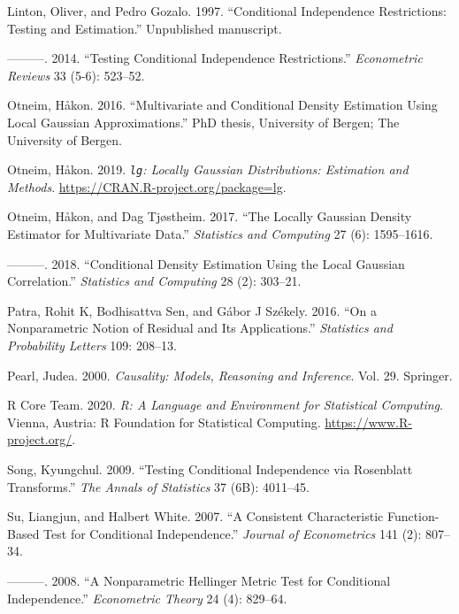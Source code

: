 \documentclass[
  12pt,
  letterpaper]{article}
\theoremstyle{definition}
\theoremstyle{definition}
\theoremstyle{definition}
\theoremstyle{remark}
\begin{document}
\leavevmode\hypertarget{ref-linton1997conditional}{}%
Linton, Oliver, and Pedro Gozalo. 1997. ``Conditional Independence Restrictions: Testing and Estimation.'' Unpublished manuscript.

\leavevmode\hypertarget{ref-linton2014testing}{}%
---------. 2014. ``Testing Conditional Independence Restrictions.'' \emph{Econometric Reviews} 33 (5-6): 523--52.

\leavevmode\hypertarget{ref-otneim2016multivariate}{}%
Otneim, Håkon. 2016. ``Multivariate and Conditional Density Estimation Using Local Gaussian Approximations.'' PhD thesis, University of Bergen; The University of Bergen.

\leavevmode\hypertarget{ref-otneim2019lg}{}%
Otneim, Håkon. 2019. \emph{\texttt{lg}: Locally Gaussian Distributions: Estimation and Methods}. \url{https://CRAN.R-project.org/package=lg}.

\leavevmode\hypertarget{ref-otneim2017locally}{}%
Otneim, Håkon, and Dag Tjøstheim. 2017. ``The Locally Gaussian Density Estimator for Multivariate Data.'' \emph{Statistics and Computing} 27 (6): 1595--1616.

\leavevmode\hypertarget{ref-otneim2017conditional}{}%
---------. 2018. ``Conditional Density Estimation Using the Local Gaussian Correlation.'' \emph{Statistics and Computing} 28 (2): 303--21.

\leavevmode\hypertarget{ref-patra2016on}{}%
Patra, Rohit K, Bodhisattva Sen, and Gábor J Székely. 2016. ``On a Nonparametric Notion of Residual and Its Applications.'' \emph{Statistics and Probability Letters} 109: 208--13.

\leavevmode\hypertarget{ref-pearl2000causality}{}%
Pearl, Judea. 2000. \emph{Causality: Models, Reasoning and Inference}. Vol. 29. Springer.

\leavevmode\hypertarget{ref-r}{}%
R Core Team. 2020. \emph{R: A Language and Environment for Statistical Computing}. Vienna, Austria: R Foundation for Statistical Computing. \url{https://www.R-project.org/}.

\leavevmode\hypertarget{ref-song2009testing}{}%
Song, Kyungchul. 2009. ``Testing Conditional Independence via Rosenblatt Transforms.'' \emph{The Annals of Statistics} 37 (6B): 4011--45.

\leavevmode\hypertarget{ref-su2007consistent}{}%
Su, Liangjun, and Halbert White. 2007. ``A Consistent Characteristic Function-Based Test for Conditional Independence.'' \emph{Journal of Econometrics} 141 (2): 807--34.

\leavevmode\hypertarget{ref-su2008nonparametric}{}%
---------. 2008. ``A Nonparametric Hellinger Metric Test for Conditional Independence.'' \emph{Econometric Theory} 24 (4): 829--64.
\end{document}
